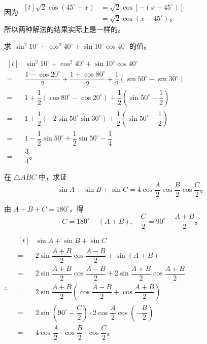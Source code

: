 因为 $\begin{aligned}[t]
    \sqrt{2} \cos(45^\circ - x) &= \sqrt{2} \cos[-(x - 45^\circ)] \\
    &= \sqrt{2} \cos(x - 45^\circ) \text{，}
\end{aligned}$ \\
所以两种解法的结果实际上是一样的。

\liti 求 $\sin^2 10^\circ + \cos^2 40^\circ + \sin 10^\circ \cos 40^\circ$ 的值。

\jie $\begin{aligned}[t]
    & \sin^2 10^\circ + \cos^2 40^\circ + \sin 10^\circ \cos 40^\circ \\
    = & \dfrac{1 - \cos 20^\circ}{2} + \dfrac{1 + \cos 80^\circ}{2} + \dfrac{1}{2}(\sin 50^\circ - \sin 30^\circ) \\
    = & 1 + \dfrac{1}{2}(\cos 80^\circ - \cos 20^\circ) + \dfrac{1}{2} \left( \sin 50^\circ - \dfrac{1}{2} \right) \\
    = & 1 + \dfrac{1}{2}(-2\sin 50^\circ \sin 30^\circ) + \dfrac{1}{2} \left( \sin 50^\circ - \dfrac{1}{2} \right) \\
    = & 1 - \dfrac{1}{2}\sin 50^\circ + \dfrac{1}{2}\sin 50^\circ - \dfrac{1}{4} \\
    = & \dfrac{3}{4} \text{。}
\end{aligned}$ \jiange

\liti 在 $\triangle ABC$ 中，求证
$$ \sin A + \sin B + \sin C = 4\cos\dfrac{A}{2} \cos\dfrac{B}{2} \cos\dfrac{C}{2} \text{。}$$

\zhengming 由 $A + B + C = 180^\circ$，得
$$ C = 180^\circ - (A + B), \quad \dfrac{C}{2} = 90^\circ - \dfrac{A + B}{2} \text{。} $$

$\therefore \quad \begin{aligned}[t]
    & \sin A + \sin B + \sin C \\
    = & 2 \sin\dfrac{A + B}{2} \cos\dfrac{A - B}{2} + \sin(A + B) \\
    = & 2 \sin\dfrac{A + B}{2} \cos\dfrac{A - B}{2} + 2\sin\dfrac{A + B}{2} \cos\dfrac{A + B}{2} \\
    = & 2 \sin\dfrac{A + B}{2} \left( \cos\dfrac{A - B}{2} + \cos\dfrac{A + B}{2} \right) \\
    = & 2 \sin(90^\circ - \dfrac{C}{2}) \cdot 2 \cos\dfrac{A}{2} \cos\left( -\dfrac{B}{2} \right) \\
    = & 4 \cos\dfrac{A}{2} \cdot \cos\dfrac{B}{2} \cdot \cos\dfrac{C}{2} \text{。}
\end{aligned}$ \jiange

